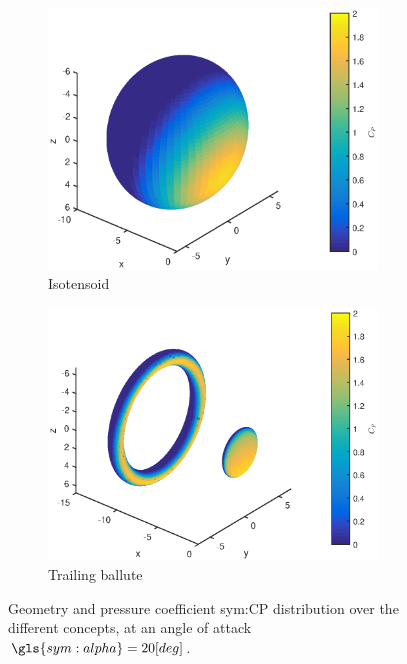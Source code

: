 \begin{figure}[h]
	\begin{subfigure}[b]{0.49\textwidth}
		\includegraphics[width=0.96\textwidth]{./Figure/aero_model/isotensoid.eps}
		\caption{Isotensoid}
		\label{fig:cpisotensoid}
	\end{subfigure}
	\begin{subfigure}[b]{0.49\textwidth}
		\includegraphics[width=0.96\textwidth]{./Figure/aero_model/ballute.eps}
		\caption{Trailing ballute}
		\label{fig:cpballute}
	\end{subfigure}	
	\caption{Geometry and pressure coefficient \gls{sym:CP} distribution over the different concepts, at an angle of attack $\gls{sym:alpha}=20[deg]$. }
	\label{fig:conceptscp}
\end{figure}

